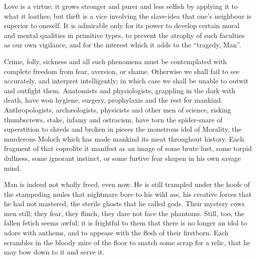 Love is a virtue; it grows stronger and purer and less selfish by applying it to what it loathes; but theft is a vice involving the slave-idea that one's neighbour is superior to oneself. It is admirable only for its power to develop certain moral and mental qualities in primitive types, to prevent the atrophy of such faculties as our own vigilance, and for the interest which it adds to the \enquote{tragedy, Man}.

Crime, folly, sickness and all such phenomena must be contemplated with complete freedom from fear, aversion, or shame. Otherwise we shall fail to see accurately, and interpret intelligently; in which case we shall be unable to outwit and outfight them. Anatomists and physiologists, grappling in the dark with death, have won hygiene, surgery, prophylaxis and the rest for mankind. Anthropologists, arch\ae{}ologists, physicists and other men of science, risking thumbscrews, stake, infamy and ostracism, have torn the spider-snare of superstition to shreds and broken in pieces the monstrous idol of Morality, the murderous Moloch which has made mankind its meat throughout history. Each fragment of that coprolite it manifest as an image of some brute lust, some torpid dullness, some ignorant instinct, or some furtive fear shapen in his own savage mind.

Man is indeed not wholly freed, even now. He is still trampled under the hoofs of the stampeding mules that nightmare bore to his wild ass, his creative forces that he had not mastered, the sterile ghosts that he called gods. Their mystery cows men still; they fear, they flinch, they dare not face the phantoms. Still, too, the fallen fetich seems awful; it is frightful to them that there is no longer an idol to adore with anthems, and to appease with the flesh of their firstborn. Each scrambles in the bloody mire of the floor to snatch some scrap for a relic, that he may bow down to it and serve it.

